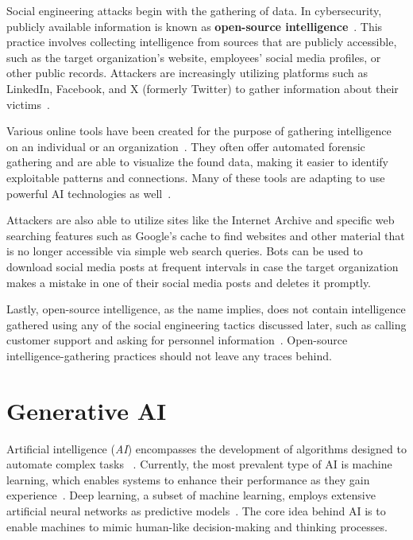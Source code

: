 Social engineering attacks begin with the gathering of data. In cybersecurity, publicly available information is known as \textbf{open-source intelligence}~\citep{hadnagy_Social_Engineering_The_Science_2018}. This practice involves collecting intelligence from sources that are publicly accessible, such as the target organization's website, employees' social media profiles, or other public records. Attackers are increasingly utilizing platforms such as LinkedIn, Facebook, and X (formerly Twitter) to gather information about their victims~\citep{fakhouri_AI_Driven_Solutions_SE_Attacks_2024}.

Various online tools have been created for the purpose of gathering intelligence on an individual or an organization~\citep{mirsky_Threat_Offensive_AI_Organizations_2023}. They often offer automated forensic gathering and are able to visualize the found data, making it easier to identify exploitable patterns and connections. Many of these tools are adapting to use powerful AI technologies as well~\citep{wang_Defining_Social_Engineering_2020}.

Attackers are also able to utilize sites like the Internet Archive and specific web searching features such as Google’s cache to find websites and other material that is no longer accessible via simple web search queries. Bots can be used to download social media posts at frequent intervals in case the target organization makes a mistake in one of their social media posts and deletes it promptly.

Lastly, open-source intelligence, as the name implies, does not contain intelligence gathered using any of the social engineering tactics discussed later, such as calling customer support and asking for personnel information~\citep{hadnagy_Social_Engineering_The_Science_2018}. Open-source intelligence-gathering practices should not leave any traces behind.





\section{Generative AI}
\begin{comment}
\end{comment}

Artificial intelligence (\textit{AI}) encompasses the development of algorithms designed to automate complex tasks ~\citep{mirsky_Threat_Offensive_AI_Organizations_2023}. Currently, the most prevalent type of AI is machine learning, which enables systems to enhance their performance as they gain experience~\citep{fakhouri_AI_Driven_Solutions_SE_Attacks_2024}. Deep learning, a subset of machine learning, employs extensive artificial neural networks as predictive models~\citep{goodfellow_Generative_Adversarial_Networks_2020}. The core idea behind AI is to enable machines to mimic human-like decision-making and thinking processes.

